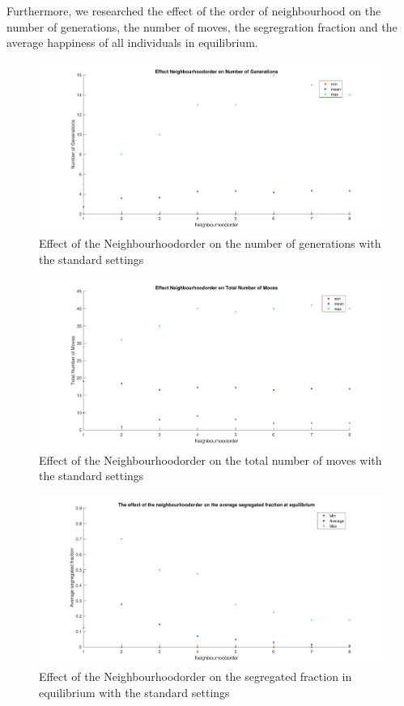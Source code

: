 Furthermore, we researched the effect of the order of neighbourhood on the number of generations, the number of moves, the segregration fraction and the average happiness of all individuals in equilibrium.

\begin{figure}[H]
	\centering
    \includegraphics[width=\textwidth]{buurtorde-aantgen.pdf}
    \caption{Effect of the Neighbourhoodorder on the number of generations with the standard settings}
    \label{fig:nbho-generations}
\end{figure}

\begin{figure}[H]
	\centering
    \includegraphics[width=\textwidth]{buurtorde-aantmov.pdf}
    \caption{Effect of the Neighbourhoodorder on the total number of moves with the standard settings}
    \label{fig:nbho-moves}
\end{figure}

\begin{figure}[H]
	\centering
    \includegraphics[width=\textwidth]{buurtorde-segreind.pdf}
    \caption{Effect of the Neighbourhoodorder on the segregated fraction in equilibrium with the standard settings}
    \label{fig:nbho-segregation}
\end{figure}

